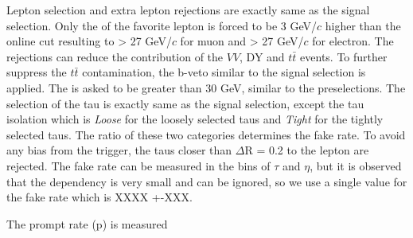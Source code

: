 Lepton selection and extra lepton rejections are exactly same as the signal selection. Only the \pT of the favorite lepton is forced to 
be 3 GeV/$c$ higher than the online cut resulting to \pT > 27 GeV/$c$ for muon and \pT > 27 GeV/$c$ for electron.
The rejections can reduce the contribution of the $VV$, DY and $t\bar{t}$ events. To further suppress the $t\bar{t}$ contamination, the b-veto 
similar to the signal selection is applied. The \met is asked to be greater than 30 GeV, similar to the preselections. The selection of the tau is 
exactly same as the signal selection, except the tau isolation which is {\it Loose} for the loosely selected taus and {\it Tight} for the tightly selected taus.
The ratio of these two categories determines the fake rate. To avoid any bias from the trigger, the taus closer than $\Delta$R = 0.2 to the lepton are rejected. 
The fake rate can be measured in the bins of $\tau$ \pT and $\eta$, but it is observed that the dependency is very small and can be ignored, so we use a single value for the fake rate which is XXXX +-XXX.

The prompt rate (p) is measured 

